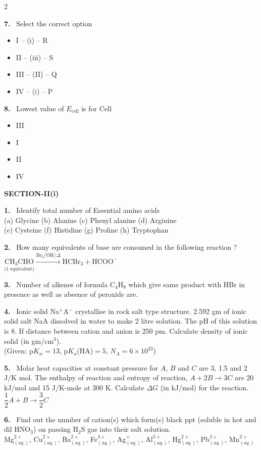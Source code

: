 \documentclass[10pt]{extarticle}
\newcommand{\sect}[1]{\par\smallskip\noindent\textbf{#1}\par}
\newcommand{\qn}[1]{\par\smallskip\noindent\textbf{#1.}~}
\newenvironment{qoptions}{\begin{itemize}[leftmargin=1.8em,itemsep=1pt,topsep=2pt,label={}]}{\end{itemize}}
\newcommand{\opt}[2]{\item[(#1)] #2}
\begin{document}
\begin{multicols}{2}

\qn{7} Select the correct option
\begin{qoptions}
\opt{A}{I -- (i) -- R}
\opt{B}{II -- (iii) -- S}
\opt{C}{III -- (II) -- Q}
\opt{D}{IV -- (i) -- P}
\end{qoptions}

\qn{8} Lowest value of $E_{\text{cell}}$ is for Cell
\begin{qoptions}
\opt{A}{III}
\opt{B}{I}
\opt{C}{II}
\opt{D}{IV}
\end{qoptions}

\sect{SECTION-II(i)}
\qn{1} Identify total number of Essential amino acids\\
(a) Glycine \quad (b) Alanine \quad (c) Phenyl alanine \quad (d) Arginine\\
(e) Cysteine \quad (f) Histidine \quad (g) Proline \quad (h) Tryptophan

\qn{2} How many equivalents of base are consumed in the following reaction ?\\
$\underset{\text{(1 equivalent)}}{\text{CH}_3\text{CHO}}\xrightarrow{\text{Br}_2/\bar{\text{O}}\text{H}/\Delta}\text{HCBr}_3+\text{HCOO}^-$

\qn{3} Number of alkenes of formula C$_4$H$_8$ which give same product with HBr in presence as well as absence of peroxide are.

\qn{4} Ionic solid Na$^+$A$^-$ crystallise in rock salt type structure. 2.592 gm of ionic solid salt NaA dissolved in water to make 2 litre solution. The pH of this solution is 8. If distance between cation and anion is 250 pm. Calculate density of ionic solid (in gm/cm$^3$).\\
{(Given: p$K_w=13$, p$K_a$(HA)$=5$, $N_A=6\times10^{23}$)}

\qn{5} Molar heat capacities at constant pressure for $A$, $B$ and $C$ are 3, 1.5 and 2 J/K mol. The enthalpy of reaction and entropy of reaction, $A+2B\to3C$ are 20 kJ/mol and 15 J/K-mole at 300 K. Calculate $\Delta G$ (in kJ/mol) for the reaction.\\
$\dfrac12A+B\to\dfrac32C$

\qn{6} Find out the number of cation(s) which form(s) black ppt (soluble in hot and dil HNO$_3$) on passing H$_2$S gas into their salt solution.\\
Mg$^{2+}_{(aq.)}$, Cu$^{2+}_{(aq.)}$, Ba$^{2+}_{(aq.)}$, Fe$^{3+}_{(aq.)}$, Ag$^+_{(aq.)}$, Al$^{3+}_{(aq.)}$, Hg$^{2+}_{(aq.)}$, Pb$^{2+}_{(aq.)}$, Mn$^{2+}_{(aq.)}$


\end{multicols}
\end{document}
